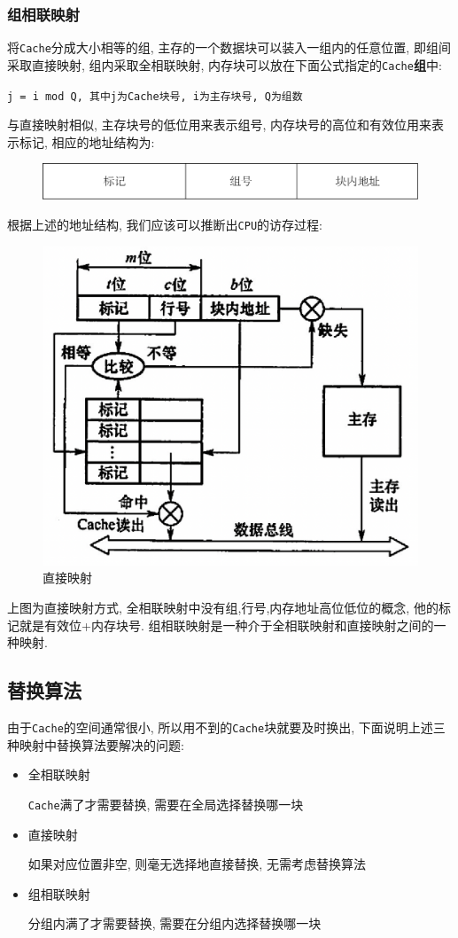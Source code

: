 \subsubsection{组相联映射}
将\verb|Cache|分成大小相等的组, 主存的一个数据块可以装入一组内的任意位置, 即组间采取直接映射, 组内采取全相联映射, 内存块可以放在下面公式指定的\verb|Cache|\textbf{组}中:
\begin{center}
\verb|j = i mod Q, 其中j为Cache块号, i为主存块号, Q为组数|
\end{center}\par 
与直接映射相似, 主存块号的低位用来表示组号, 内存块号的高位和有效位用来表示标记, 相应的地址结构为:
\begin{figure}[H]
\centering
\includegraphics[scale=.5]{img/figure14.pdf}
\end{figure}
根据上述的地址结构, 我们应该可以推断出\verb|CPU|的访存过程:
\begin{figure}[H]
\centering
\includegraphics[scale=.45]{img/figure16.png}
\caption*{直接映射}
\end{figure}\par
上图为直接映射方式, 全相联映射中没有组,行号,内存地址高位低位的概念, 他的标记就是有效位+内存块号. 组相联映射是一种介于全相联映射和直接映射之间的一种映射.
\subsection{替换算法}
由于\verb|Cache|的空间通常很小, 所以用不到的\verb|Cache|块就要及时换出, 下面说明上述三种映射中替换算法要解决的问题:
\begin{itemize}
\item 全相联映射 \par \verb|Cache|满了才需要替换, 需要在全局选择替换哪一块
\item 直接映射 \par 如果对应位置非空, 则毫无选择地直接替换, 无需考虑替换算法
\item 组相联映射 \par 分组内满了才需要替换, 需要在分组内选择替换哪一块
\end{itemize}
